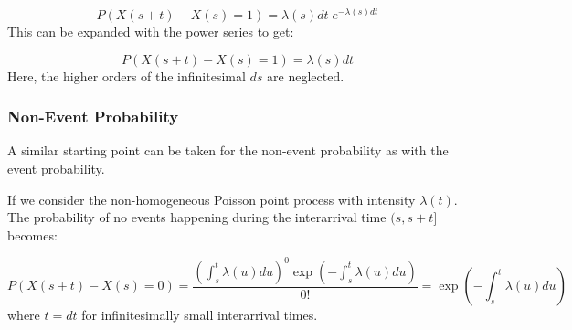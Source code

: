 \begin{equation}
    P(X(s+t) - X(s) = 1) = \lambda(s)dt \; e^{-\lambda(s)dt}
\end{equation}
This can be expanded with the power series to get:

\begin{equation}
    P(X(s+t) - X(s) = 1) = \lambda(s) dt
\end{equation}
Here, the higher orders of the infinitesimal $ds$ are neglected.


\subsubsection{Non-Event Probability}
\label{sec:Method:Poisson:NonEventProbability}
A similar starting point can be taken for the non-event probability as with the event probability.

If we consider the non-homogeneous Poisson point process with intensity $\lambda(t)$. 
The probability of no events happening during the interarrival time $(s, s+t]$ becomes:

\begin{equation}
    P(X(s+t) - X(s) = 0) 
    = 
    \frac{\left(\int_s^t \lambda(u)du \right)^0 \exp \left(- \int_s^t \lambda(u)du\right)}{0!}
    = 
    \exp \left(- \int_s^t \lambda(u)du\right)
\end{equation}
where $t = dt$ for infinitesimally small interarrival times.
